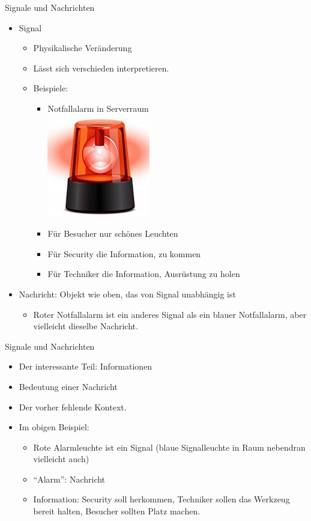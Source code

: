 \begin{frame}{Signale und Nachrichten}	
	\begin{itemize}
		\pause\item Signal
		\begin{itemize}
			\pause\item Physikalische Veränderung
			\pause\item Lässt sich verschieden interpretieren.
			\pause\item Beispiele:
			\begin{itemize}
				\pause\item Notfallalarm in Serverraum\\
				\pause \includegraphics[width=.1\linewidth]{images/alarm.jpg}\\
				\pause\item Für Besucher nur schönes Leuchten
				\pause\item Für Security die Information, zu kommen
				\pause\item Für Techniker die Information, Ausrüstung zu holen
			\end{itemize}
		\end{itemize}
		
		\pause\item Nachricht\pause : Objekt wie oben, das von Signal unabhängig ist
		\begin{itemize}
			\pause\item Roter Notfallalarm ist ein anderes Signal als ein blauer Notfallalarm\pause , aber vielleicht dieselbe Nachricht.
		\end{itemize}
	\end{itemize}
\end{frame}

\begin{frame}{Signale und Nachrichten}
	\begin{itemize}
		\pause\item Der interessante Teil: \pause Informationen
		\pause\item Bedeutung einer Nachricht
		\pause\item Der vorher fehlende Kontext.
		\pause\item Im obigen Beispiel:
		\begin{itemize}
			\pause\item Rote Alarmleuchte ist ein Signal \pause (blaue Signalleuchte in Raum nebendran vielleicht auch)
			\pause\item ``Alarm'': Nachricht
			\pause\item Information: \pause Security soll herkommen\pause , Techniker sollen das Werkzeug bereit halten\pause , Besucher sollten Platz machen.
		\end{itemize}
	\end{itemize}
\end{frame}

